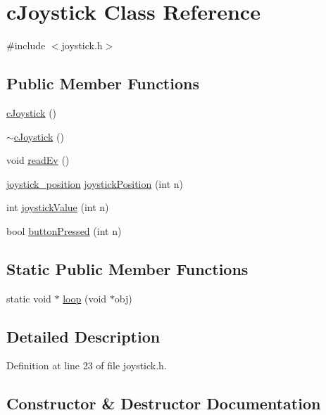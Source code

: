 \hypertarget{classc_joystick}{}\section{c\+Joystick Class Reference}
\label{classc_joystick}


{\ttfamily \#include $<$joystick.\+h$>$}

\subsection*{Public Member Functions}
\begin{DoxyCompactItemize}
\item 
\hyperlink{classc_joystick_ae4edecc3589f19b068113cdb79f7b39d}{c\+Joystick} ()
\item 
\hyperlink{classc_joystick_a9e429f765dee1dc7dc3d31dc0f50ae0e}{$\sim$c\+Joystick} ()
\item 
void \hyperlink{classc_joystick_a8c04dc903aac9588db3b3e81f495705a}{read\+Ev} ()
\item 
\hyperlink{structjoystick__position}{joystick\+\_\+position} \hyperlink{classc_joystick_a30d938005453ad77f512094c8a7a99f5}{joystick\+Position} (int n)
\item 
int \hyperlink{classc_joystick_a2954017eb51ef6f4658450199e5df5b4}{joystick\+Value} (int n)
\item 
bool \hyperlink{classc_joystick_a10375763b82c2da3e904d118d5cf2ecb}{button\+Pressed} (int n)
\end{DoxyCompactItemize}
\subsection*{Static Public Member Functions}
\begin{DoxyCompactItemize}
\item 
static void $\ast$ \hyperlink{classc_joystick_aafa52c2e4d67c71f3d1e31b80d1dd324}{loop} (void $\ast$obj)
\end{DoxyCompactItemize}


\subsection{Detailed Description}


Definition at line 23 of file joystick.\+h.



\subsection{Constructor \& Destructor Documentation}
\mbox{\label{classc_joystick_ae4edecc3589f19b068113cdb79f7b39d}} 
